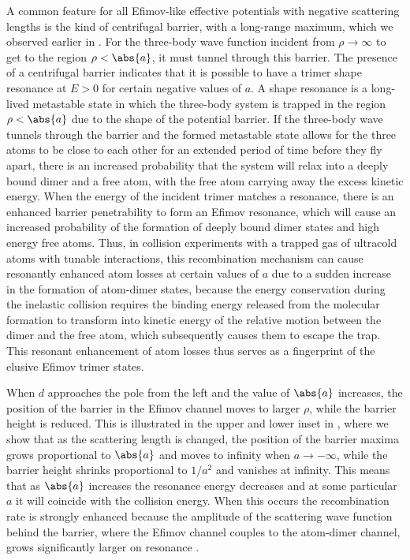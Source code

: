 A common feature for all Efimov-like effective potentials with negative scattering lengths is the kind of centrifugal barrier, with a long-range maximum, which we observed earlier in . For the three-body wave function incident from $\rho \rightarrow \infty$ to get to the region $\rho<\abs{a}$, it must tunnel through this barrier. The presence of a centrifugal barrier indicates that it is possible to have a trimer shape resonance at $E>0$ for certain negative values of $a$. A shape resonance is a long-lived metastable state in which the three-body system is trapped in the region $\rho<\abs{a}$ due to the shape of the potential barrier. If the three-body wave tunnels through the barrier and the formed metastable state allows for the three atoms to be close to each other for an extended period of time before they fly apart, there is an increased probability that the system will relax into a deeply bound dimer and a free atom, with the free atom carrying away the excess kinetic energy. When the energy of the incident trimer matches a resonance, there is an enhanced barrier penetrability to form an Efimov resonance, which will cause an increased probability of the formation of deeply bound dimer states and high energy free atoms. Thus, in collision experiments with a trapped gas of ultracold atoms with tunable interactions, this recombination mechanism can cause resonantly enhanced atom losses at certain values of $a$ due to a sudden increase in the formation of atom-dimer states, because the energy conservation during the inelastic collision requires the binding energy released from the molecular formation to transform into kinetic energy of the relative motion between the dimer and the free atom, which subsequently causes them to escape the trap. This resonant enhancement of atom losses thus serves as a fingerprint of the elusive Efimov trimer states. 

When $d$ approaches the pole from the left and the value of $\abs{a}$ increases, the position of the barrier in the Efimov channel moves to larger $\rho$, while the barrier height is reduced. This is illustrated in the upper and lower inset in , where we show that as the scattering length is changed, the position of the barrier maxima grows proportional to $\abs{a}$ and moves to infinity when $a \rightarrow -\infty$, while the barrier height shrinks proportional to $1/a^2$ and vanishes at infinity. This means that as $\abs{a}$ increases the resonance energy decreases and at some particular $a$ it will coincide with the collision energy. When this occurs the recombination rate is strongly enhanced because the amplitude of the scattering wave function behind the barrier, where the Efimov channel couples to the atom-dimer channel, grows significantly larger on resonance \cite{Esry_2007}.

